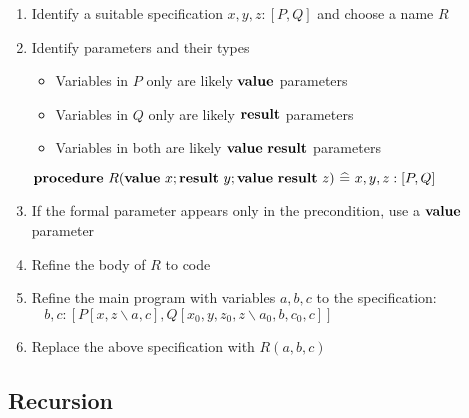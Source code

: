 \begin{itemize}
	\begin{enumerate}
		
		\item Identify a suitable specification $ x, y, z : [P, Q] $ and choose a name $ R $
		
		\item Identify parameters and their types
		
		\begin{itemize}
			
			\item Variables in $ P $ only are likely $ {\bf value} $ parameters
			
			\item Variables in $ Q $ only are likely $ {\bf result} $ parameters
			
			\item Variables in both are likely $ {\bf value} ~ {\bf result} $ parameters
			
		\end{itemize}
		
		$ {\bf procedure} ~ R({\bf value} ~ x; {\bf result} ~ y; {\bf value} ~ {\bf result} ~ z) ~ \widehat{=} ~ x, y, z : [P, Q] $
		
		\item If the formal parameter appears only in the precondition, use a $ {\bf value} $ parameter
		
		\item Refine the body of $ R $ to code
		
		\item Refine the main program with variables $ a, b, c $ to the specification:\\
		$ ~~~~ b, c : [P[x, z \backslash a, c], Q[x_0, y, z_0, z \backslash a_0, b, c_0, c]]$
		
		\item Replace the above specification with $ R(a, b, c) $
		
	\end{enumerate}
	
\end{itemize}

\newpage

\subsection{Recursion}

